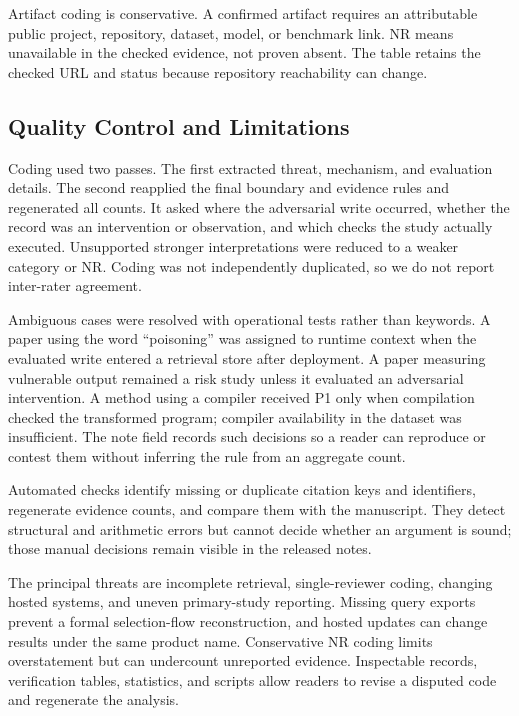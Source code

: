 \documentclass[acmsmall,screen,review]{acmart}
\begin{document}
Artifact coding is conservative. A confirmed artifact requires an attributable public project, repository, dataset, model, or benchmark link. \textsf{NR} means unavailable in the checked evidence, not proven absent. The table retains the checked URL and status because repository reachability can change.

\subsection{Quality Control and Limitations}
Coding used two passes. The first extracted threat, mechanism, and evaluation details. The second reapplied the final boundary and evidence rules and regenerated all counts. It asked where the adversarial write occurred, whether the record was an intervention or observation, and which checks the study actually executed. Unsupported stronger interpretations were reduced to a weaker category or \textsf{NR}. Coding was not independently duplicated, so we do not report inter-rater agreement.

Ambiguous cases were resolved with operational tests rather than keywords. A paper using the word ``poisoning'' was assigned to runtime context when the evaluated write entered a retrieval store after deployment. A paper measuring vulnerable output remained a risk study unless it evaluated an adversarial intervention. A method using a compiler received P1 only when compilation checked the transformed program; compiler availability in the dataset was insufficient. The note field records such decisions so a reader can reproduce or contest them without inferring the rule from an aggregate count.

Automated checks identify missing or duplicate citation keys and identifiers, regenerate evidence counts, and compare them with the manuscript. They detect structural and arithmetic errors but cannot decide whether an argument is sound; those manual decisions remain visible in the released notes.

The principal threats are incomplete retrieval, single-reviewer coding, changing hosted systems, and uneven primary-study reporting. Missing query exports prevent a formal selection-flow reconstruction, and hosted updates can change results under the same product name. Conservative \textsf{NR} coding limits overstatement but can undercount unreported evidence. Inspectable records, verification tables, statistics, and scripts allow readers to revise a disputed code and regenerate the analysis.
\end{document}
